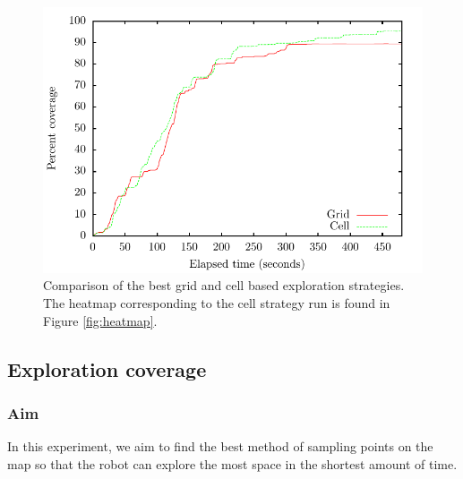 \documentclass[conference]{IEEEtran}
\begin{document}
\begin{figure}[h]
  \includegraphics[width=\columnwidth]{percent_coverage_time}
  \caption{Comparison of the best grid and cell based exploration strategies. The heatmap corresponding to the cell strategy run is found in Figure \ref{fig:heatmap}.}
  \label{fig:coverage}
\end{figure}
\subsection{Exploration coverage}
\subsubsection{Aim}
In this experiment, we aim to find the best method of sampling points on the map so that the robot can explore the most space in the shortest amount of time.
\end{document}
